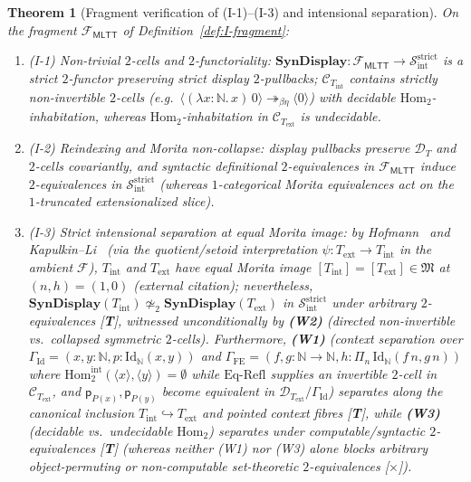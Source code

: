 \documentclass[11pt]{article}
\theoremstyle{plain}
\newtheorem{theorem}{Theorem}[section]
\theoremstyle{definition}
\newcommand{\cF}{\mathcal{F}}
\newcommand{\cC}{\mathcal{C}}
\newcommand{\cD}{\mathcal{D}}
\newcommand{\fM}{\mathfrak{M}}
\newcommand{\Hom}{\mathrm{Hom}}
\newcommand{\MLTT}{\mathsf{MLTT}}
\begin{document}
\begin{theorem}[Fragment verification of (I-1)--(I-3) and intensional separation]\label{thm:I-fragment}
On the fragment $\mathcal{F}_{\MLTT}$ of Definition~\ref{def:I-fragment}:
\begin{enumerate}[nosep,label=(\roman*)]
\item \emph{\textup{(I-1)} Non-trivial $2$-cells and $2$-functoriality}: $\mathbf{SynDisplay} : \mathcal{F}_{\MLTT} \to \mathcal{S}_{\mathrm{int}}^{\mathrm{strict}}$ is a strict $2$-functor preserving strict display $2$-pullbacks; $\cC_{T_{\mathrm{int}}}$ contains strictly non-invertible $2$-cells (e.g.\ $\langle (\lambda x:\mathbb{N}.\,x)\,0 \rangle \twoheadrightarrow_{\beta\eta} \langle 0 \rangle$) with decidable $\Hom_2$-inhabitation, whereas $\Hom_2$-inhabitation in $\cC_{T_{\mathrm{ext}}}$ is undecidable.
\item \emph{\textup{(I-2)} Reindexing and Morita non-collapse}: display pullbacks preserve $\cD_T$ and $2$-cells covariantly, and syntactic definitional $2$-equivalences in $\mathcal{F}_{\MLTT}$ induce $2$-equivalences in $\mathcal{S}_{\mathrm{int}}^{\mathrm{strict}}$ (whereas $1$-categorical Morita equivalences act on the $1$-truncated extensionalized slice).
\item \emph{\textup{(I-3)} Strict intensional separation at equal Morita image}: by Hofmann~\cite{Hofmann1995} and Kapulkin--Li~\cite{KapulkinLi2025} (via the quotient/setoid interpretation $\psi : T_{\mathrm{ext}} \to T_{\mathrm{int}}$ in the ambient $\cF$), $T_{\mathrm{int}}$ and $T_{\mathrm{ext}}$ have equal Morita image $[T_{\mathrm{int}}] = [T_{\mathrm{ext}}] \in \fM$ at $(n, h) = (1, 0)$ (external citation); nevertheless, $\mathbf{SynDisplay}(T_{\mathrm{int}}) \not\simeq_2 \mathbf{SynDisplay}(T_{\mathrm{ext}})$ in $\mathcal{S}_{\mathrm{int}}^{\mathrm{strict}}$ under \emph{arbitrary} $2$-equivalences \textup{[\textbf{T}]}, witnessed unconditionally by \textbf{(W2)} (directed non-invertible vs.\ collapsed symmetric $2$-cells). Furthermore, \textbf{(W1)} (context separation over $\Gamma_{\mathrm{Id}} = (x,y:\mathbb{N}, p:\mathrm{Id}_{\mathbb{N}}(x,y))$ and $\Gamma_{\mathrm{FE}} = (f,g:\mathbb{N}\to\mathbb{N}, h:\Pi_n\,\mathrm{Id}_{\mathbb{N}}(f\,n,g\,n))$ where $\Hom_2^{\mathrm{int}}(\langle x\rangle,\langle y\rangle)=\emptyset$ while $\text{Eq-Refl}$ supplies an invertible $2$-cell in $\cC_{T_{\mathrm{ext}}}$, and $\mathsf{p}_{P(x)}, \mathsf{p}_{P(y)}$ become equivalent in $\cD_{T_{\mathrm{ext}}}/\Gamma_{\mathrm{Id}}$) separates along the canonical inclusion $T_{\mathrm{int}} \hookrightarrow T_{\mathrm{ext}}$ and pointed context fibres \textup{[\textbf{T}]}, while \textbf{(W3)} (decidable vs.\ undecidable $\Hom_2$) separates under computable/syntactic $2$-equivalences \textup{[\textbf{T}]} (whereas neither (W1) nor (W3) alone blocks arbitrary object-permuting or non-computable set-theoretic $2$-equivalences \textup{[\textbf{$\times$}]}).
\end{enumerate}
\end{theorem}
\end{document}
